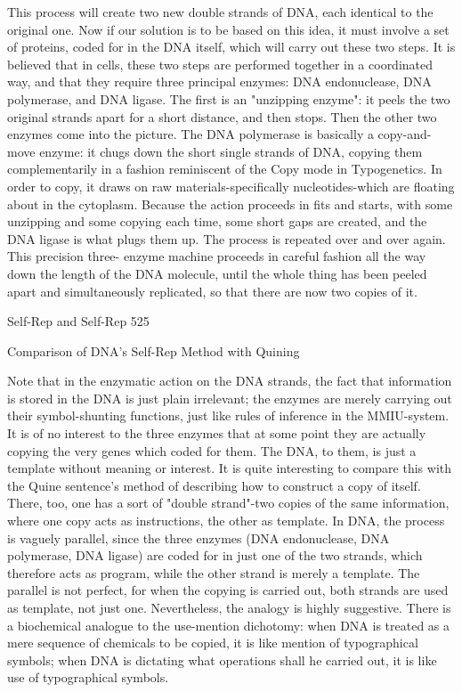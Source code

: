 {This process will create two new double strands of DNA, each identical to the original one.
Now if our solution is to be based on this idea, it must involve a set of proteins, coded for in
the DNA itself, which will carry out these two steps.
        It is believed that in cells, these two steps are performed together in a coordinated
way, and that they require three principal enzymes: DNA endonuclease, DNA polymerase,
and DNA ligase. The first is an "unzipping enzyme": it peels the two original strands apart
for a short distance, and then stops. Then the other two enzymes come into the picture. The
DNA polymerase is basically a copy-and-move enzyme: it chugs down the short single
strands of DNA, copying them complementarily in a fashion reminiscent of the Copy mode
in Typogenetics. In order to copy, it draws on raw materials-specifically nucleotides-which
are floating about in the cytoplasm. Because the action proceeds in fits and starts, with some
unzipping and some copying each time, some short gaps are created, and the DNA ligase is
what plugs them up. The process is repeated over and over again. This precision three-
enzyme machine proceeds in careful fashion all the way down the length of the DNA
molecule, until the whole thing has been peeled apart and simultaneously replicated, so that
there are now two copies of it.




Self-Rep and Self-Rep                                                                       525

                  Comparison of DNA's Self-Rep Method with Quining

Note that in the enzymatic action on the DNA strands, the fact that information is stored in
the DNA is just plain irrelevant; the enzymes are merely carrying out their symbol-shunting
functions, just like rules of inference in the MMIU-system. It is of no interest to the three
enzymes that at some point they are actually copying the very genes which coded for them.
The DNA, to them, is just a template without meaning or interest.
         It is quite interesting to compare this with the Quine sentence's method of describing
how to construct a copy of itself. There, too, one has a sort of "double strand"-two copies of
the same information, where one copy acts as instructions, the other as template. In DNA, the
process is vaguely parallel, since the three enzymes (DNA endonuclease, DNA polymerase,
DNA ligase) are coded for in just one of the two strands, which therefore acts as program,
while the other strand is merely a template. The parallel is not perfect, for when the copying
is carried out, both strands are used as template, not just one. Nevertheless, the analogy is
highly suggestive. There is a biochemical analogue to the use-mention dichotomy: when
DNA is treated as a mere sequence of chemicals to be copied, it is like mention of
typographical symbols; when DNA is dictating what operations shall he carried out, it is like
use of typographical symbols.


}
